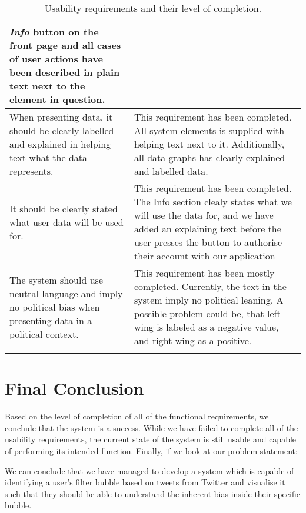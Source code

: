 \begin{longtable}{|p{6cm}|p{8.5cm}|}
\textit{Info} button on the front page and all cases of user actions have been
described in plain text next to the element in question. \\\hline
When presenting data, it should be clearly labelled and explained in
helping text what the data represents.
& This requirement has been completed. All system elements is supplied with
helping text next to it. Additionally, all data graphs has clearly explained and
labelled data. \\\hline
It should be clearly stated what user data will be used for.
&	This requirement has been completed. The Info section clealy states what we
will use the data for, and we have added an explaining text before the user
presses the button to authorise their account with our application \\\hline
The system should use neutral language and imply no political bias when
presenting data in a political context.
&	This requirement has been mostly completed. Currently, the text in the system
imply no political leaning. A possible problem could be, that left-wing
is labeled as a negative value, and right wing as a positive.\\\hline
\caption{Usability requirements and their level of completion.}
\label{table:concUsaReq}
\end{longtable}

\section{Final Conclusion}
Based on the level of completion of all of the functional
requirements, we conclude that the system is a success. While we have failed to
complete all of the usability requirements, the current state of the system is
still usable and capable of performing its intended function. Finally, if we
look at our problem statement:\nl

\nl

We can conclude that we have managed to develop a system which is capable of
identifying a user's filter bubble based on tweets from Twitter and visualise
it such that they should be able to understand the inherent bias inside their
specific bubble.




















